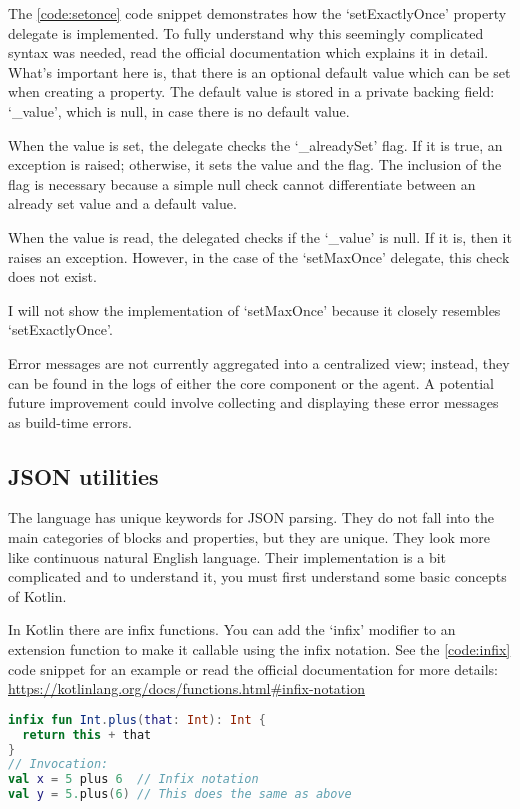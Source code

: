 The \ref{code:setonce} code snippet demonstrates how the `setExactlyOnce' property delegate is implemented. To fully understand why this seemingly complicated syntax was needed, read the official documentation which explains it in detail. What's important here is, that there is an optional default value which can be set when creating a property. The default value is stored in a private backing field: `\_value', which is null, in case there is no default value. 

When the value is set, the delegate checks the `\_alreadySet' flag. If it is true, an exception is raised; otherwise, it sets the value and the flag. The inclusion of the flag is necessary because a simple null check cannot differentiate between an already set value and a default value.

When the value is read, the delegated checks if the `\_value' is null. If it is, then it raises an exception. However, in the case of the `setMaxOnce' delegate, this check does not exist.

I will not show the implementation of `setMaxOnce' because it closely resembles `setExactlyOnce'.

Error messages are not currently aggregated into a centralized view; instead, they can be found in the logs of either the core component or the agent. A potential future improvement could involve collecting and displaying these error messages as build-time errors.

\subsection{JSON utilities}

The language has unique keywords for JSON parsing. They do not fall into the main categories of blocks and properties, but they are unique. They look more like continuous natural English language. Their implementation is a bit complicated and to understand it, you must first understand some basic concepts of Kotlin.

In Kotlin there are infix functions. You can add the `infix' modifier to an extension function to make it callable using the infix notation. See the \ref{code:infix} code snippet for an example or read the official documentation for more details: \url{https://kotlinlang.org/docs/functions.html#infix-notation}

\begin{minipage}{\linewidth}
\begin{lstlisting}[caption={Infix functions},language=Kotlin,label=code:infix]
infix fun Int.plus(that: Int): Int {
  return this + that
}
// Invocation:
val x = 5 plus 6  // Infix notation
val y = 5.plus(6) // This does the same as above
\end{lstlisting}
\end{minipage}

